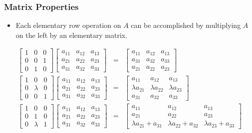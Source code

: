 \documentclass[notheorems,mathserif,table,compress]{beamer}  %
\begin{document}
\begin{frame}
\frametitle{Matrix Properties}
\begin{itemize}
\item Each elementary row operation on $A$ can be accomplished by multiplying $A$ on the left by an elementary matrix.
\end{itemize}
\begin{eqnarray*}
\begin{bmatrix}
1 & 0 & 0\\
0 & 0 & 1\\
0 & 1 & 0
\end{bmatrix} 
\begin{bmatrix}
a_{11} & a_{12} & a_{13}\\
a_{21} & a_{22} & a_{23}\\
a_{31} & a_{32} & a_{33}
\end{bmatrix}
&=&
\begin{bmatrix}
a_{11} & a_{12} & a_{13}\\
a_{31} & a_{32} & a_{33}\\
a_{21} & a_{22} & a_{23}
\end{bmatrix} \\
\begin{bmatrix}
1 & 0 & 0\\
0 & \lambda & 0\\
0 & 0 & 1
\end{bmatrix} 
\begin{bmatrix}
a_{11} & a_{12} & a_{13}\\
a_{21} & a_{22} & a_{23}\\
a_{31} & a_{32} & a_{33}
\end{bmatrix}
&=&
\begin{bmatrix}
a_{11} & a_{12} & a_{13}\\
\lambda a_{21} & \lambda a_{22} & \lambda a_{23}\\
a_{31} & a_{32} & a_{33}
\end{bmatrix} \\
\begin{bmatrix}
1 & 0 & 0\\
0 & 1 & 0\\
0 & \lambda & 1
\end{bmatrix} 
\begin{bmatrix}
a_{11} & a_{12} & a_{13}\\
a_{21} & a_{22} & a_{23}\\
a_{31} & a_{32} & a_{33}
\end{bmatrix}
&=&
\begin{bmatrix}
a_{11} & a_{12} & a_{13}\\
a_{21} & a_{22} & a_{23}\\
\lambda a_{21}+a_{31} & \lambda a_{22}+a_{32} & \lambda a_{23}+a_{33}
\end{bmatrix} 
\end{eqnarray*}

\end{frame}
\end{document}
